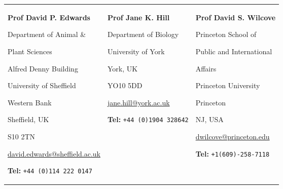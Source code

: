 

\setlength{\tabcolsep}{0.5em} %
\begin{tabular}{ p{5.6cm} p{4.6cm} p{4.6cm}}
\textbf{Prof David P. Edwards}\par
Department of Animal \& 
    \par \hspace{0.5em} Plant Sciences\par 
Alfred Denny Building\par 
University of Sheffield\par
Western Bank \par
Sheffield, UK\par
S10 2TN\par
\url{david.edwards@sheffield.ac.uk}\par
\textbf{Tel:} {\texttt{+44 (0)114 222 0147}}
& 
\textbf{Prof Jane K. Hill}\par
Department of Biology\par
University of York\par
York, UK\par
YO10 5DD\par
\url{jane.hill@york.ac.uk}\par
\textbf{Tel:} {\texttt{+44 (0)1904 328642}}
& 
\textbf{Prof David S. Wilcove}\par
Princeton School of
    \par \hspace{0.5em}Public and International
    \par \hspace{0.5em}Affairs\par
Princeton University\par
Princeton\par
NJ, USA\par
\url{dwilcove@princeton.edu}\par
\textbf{Tel:} {\texttt{+1(609)-258-7118}}
\\
\end{tabular}
